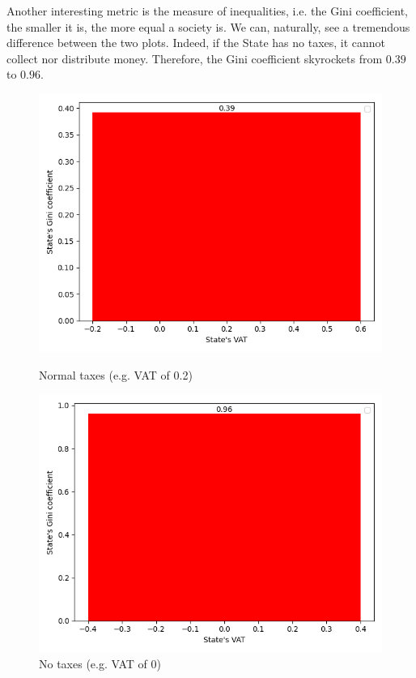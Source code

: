         Another interesting metric is the measure of inequalities, i.e. the Gini coefficient, the smaller it is, the more equal a society is. We can, naturally, see a tremendous difference between the two plots. Indeed, if the State has no taxes, it cannot collect nor distribute money. Therefore, the Gini coefficient skyrockets from $0.39$ to $0.96$.

        \begin{figure}[H]
                \includegraphics[width=\linewidth]{img/exp/1_1_3.png}
                \caption{Normal taxes (e.g. VAT of 0.2)}
            \endminipage\hfill
                \includegraphics[width=\linewidth]{img/exp/1_2_3.png}
                \caption{No taxes (e.g. VAT of 0)}
            \endminipage\hfill
        \end{figure}

